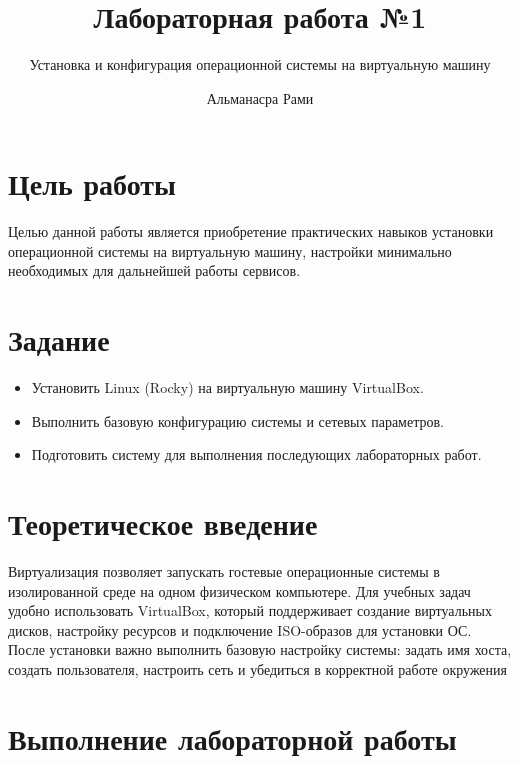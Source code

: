 \documentclass[
  english,
  russian,
  12pt,
  a4paper,
  DIV=11,
  numbers=noendperiod]{scrreprt}
\title{Лабораторная работа №1}
\subtitle{Установка и конфигурация операционной системы на виртуальную
машину}
\author{Альманасра Рами}
\date{}
\providecommand{\tightlist}{%
  \setlength{\itemsep}{0pt}\setlength{\parskip}{0pt}}
\renewcommand*\contentsname{Содержание}
\newcommand\contentsname{Содержание}
\begin{document}
\maketitle

\renewcommand*\contentsname{Содержание}
{
\setcounter{tocdepth}{1}
\tableofcontents
}
\listoffigures
\listoftables

\chapter{Цель
работы}\label{ux446ux435ux43bux44c-ux440ux430ux431ux43eux442ux44b}

Целью данной работы является приобретение практических навыков установки
операционной системы на виртуальную машину, настройки минимально
необходимых для дальнейшей работы сервисов.

\chapter{Задание}\label{ux437ux430ux434ux430ux43dux438ux435}

\begin{itemize}
\tightlist
\item
  Установить Linux (Rocky) на виртуальную машину VirtualBox.
\item
  Выполнить базовую конфигурацию системы и сетевых параметров.
\item
  Подготовить систему для выполнения последующих лабораторных работ.
\end{itemize}

\chapter{Теоретическое
введение}\label{ux442ux435ux43eux440ux435ux442ux438ux447ux435ux441ux43aux43eux435-ux432ux432ux435ux434ux435ux43dux438ux435}

Виртуализация позволяет запускать гостевые операционные системы в
изолированной среде на одном физическом компьютере. Для учебных задач
удобно использовать VirtualBox, который поддерживает создание
виртуальных дисков, настройку ресурсов и подключение ISO-образов для
установки ОС. После установки важно выполнить базовую настройку системы:
задать имя хоста, создать пользователя, настроить сеть и убедиться в
корректной работе окружения

\chapter{Выполнение лабораторной
работы}\label{ux432ux44bux43fux43eux43bux43dux435ux43dux438ux435-ux43bux430ux431ux43eux440ux430ux442ux43eux440ux43dux43eux439-ux440ux430ux431ux43eux442ux44b}
\end{document}
